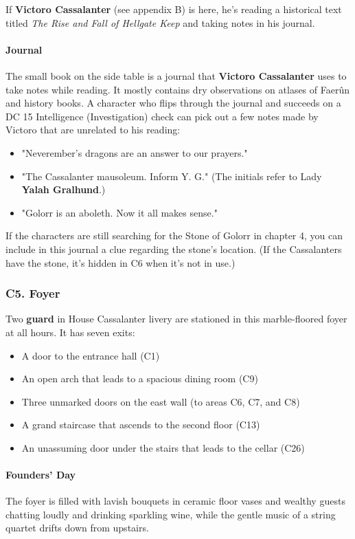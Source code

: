 \documentclass[10pt,a4paper,twoside,twocolumn,openany,nodeprecatedcode]{dndbook}
\begin{document}
If \textbf{Victoro Cassalanter} (see appendix B) is here, he's reading a historical text titled \textit{The Rise and Fall of Hellgate Keep} and taking notes in his journal.
\paragraph{Journal}
The small book on the side table is a journal that \textbf{Victoro Cassalanter} uses to take notes while reading. It mostly contains dry observations on atlases of Faerûn and history books. A character who flips through the journal and succeeds on a DC 15 Intelligence (Investigation) check can pick out a few notes made by Victoro that are unrelated to his reading:
\begin{itemize}

\item "Neverember's dragons are an answer to our prayers."
\item "The Cassalanter mausoleum. Inform Y. G." (The initials refer to Lady \textbf{Yalah Gralhund}.)
\item "Golorr is an aboleth. Now it all makes sense."
\end{itemize}


If the characters are still searching for the Stone of Golorr in chapter 4, you can include in this journal a clue regarding the stone's location. (If the Cassalanters have the stone, it's hidden in C6 when it's not in use.)
\subsubsection{C5. Foyer}
Two \textbf{guard} in House Cassalanter livery are stationed in this marble-floored foyer at all hours. It has seven exits:
\begin{itemize}

\item A door to the entrance hall (C1)
\item An open arch that leads to a spacious dining room (C9)
\item Three unmarked doors on the east wall (to areas C6, C7, and C8)
\item A grand staircase that ascends to the second floor (C13)
\item An unassuming door under the stairs that leads to the cellar (C26)
\end{itemize}


\paragraph{Founders' Day}
The foyer is filled with lavish bouquets in ceramic floor vases and wealthy guests chatting loudly and drinking sparkling wine, while the gentle music of a string quartet drifts down from upstairs.
\end{document}
